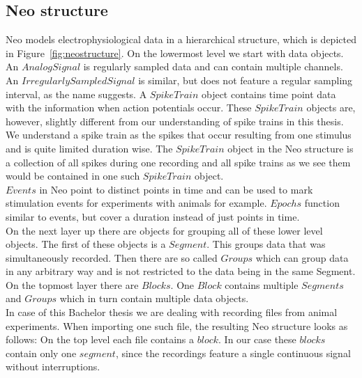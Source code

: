 \subsection{Neo structure}
Neo models electrophysiological data in a hierarchical structure, which is depicted in Figure~\ref{fig:neostructure}. On the lowermost level we start with data objects. An $AnalogSignal$ is regularly sampled data and can contain multiple channels. An $IrregularlySampledSignal$ is similar, but does not feature a regular sampling interval, as the name suggests. A $SpikeTrain$ object contains time point data with the information when action potentials occur. These $SpikeTrain$ objects are, however, slightly different from our understanding of spike trains in this thesis. We understand a spike train as the spikes that occur resulting from one stimulus and is quite limited duration wise. The $SpikeTrain$ object in the Neo structure is a collection of all spikes during one recording and all spike trains as we see them would be contained in one such $SpikeTrain$ object.\\
$Events$ in Neo point to distinct points in time and can be used to mark stimulation events for experiments with animals for example. $Epochs$ function similar to events, but cover a duration instead of just points in time.\\
On the next layer up there are objects for grouping all of these lower level objects. The first of these objects is a $Segment$. This groups data that was simultaneously recorded. Then there are so called $Groups$ which can group data in any arbitrary way and is not restricted to the data being  in the same Segment. On the topmost layer there are $Blocks$. One $Block$ contains multiple $Segments$ and $Groups$ which in turn contain multiple data objects.\\

In case of this Bachelor thesis we are dealing with recording files from animal experiments. When importing one such file, the resulting Neo structure looks as follows: On the top level each file contains a $block$. In our case these $blocks$ contain only one $segment$, since the recordings feature a single continuous signal without interruptions.

